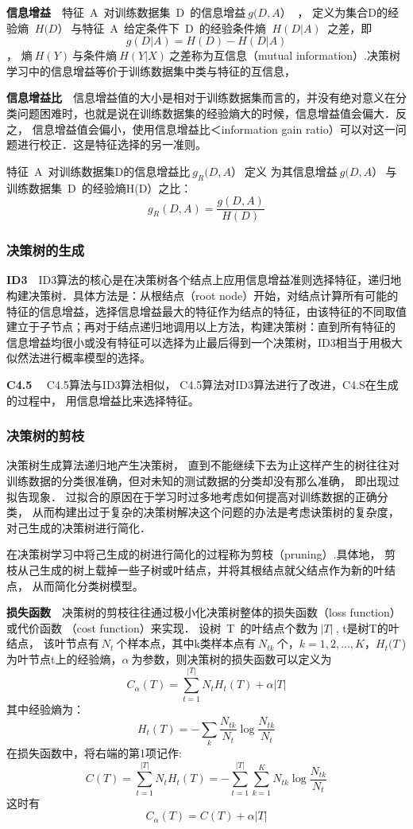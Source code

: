 \textbf{信息增益}~~特征~A~对训练数据集~D~的信息增益$~g(D,A）~$ ， 定义为集合D的经验熵 $~H(D）~$与特征~A~给定条件下~D~的经验条件熵 $~H(D|A)~$ 之差，即$$g(D|A) = H(D)-H(D|A)$$
， 熵$~H(Y)~$与条件熵$~H(Y|X)~$之差称为互信息（mutual information）.决策树学习中的信息增益等价于训练数据集中类与特征的互信息，

\textbf{信息增益比}~~信息增益值的大小是相对于训练数据集而言的，并没有绝对意义在分类问题困难时，也就是说在训练数据集的经验熵大的时候，信息增益值会偏大．反之， 信息增益值会偏小，使用信息增益比＜information gain ratio）可以对这一问题进行校正．这是特征选择的另一准则。

特征~A~对训练数据集D的信息增益比$~g_R(D,A）~$定义 为其信息增益$~g(D,A）~$与训练数据集~D~的经验熵H(D）之比：$$g_R(D,A)=\frac{g(D,A)}{H(D)}$$


\subsubsection{决策树的生成}
\textbf{ID3}~~ID3算法的核心是在决策树各个结点上应用信息增益准则选择特征，递归地构建决策树．具体方法是：从根结点（root node）开始，对结点计算所有可能的特征的信息增益，选择信息增益最大的特征作为结点的特征，由该特征的不同取值建立于子节点；再对于结点递归地调用以上方法，构建决策树：直到所有特征的 信息增益均很小或没有特征可以选择为止最后得到一个决策树，ID3相当于用极大似然法进行概率模型的选择。

\textbf{C4.5}~~ C4.5算法与ID3算法相似， C4.5算法对ID3算法进行了改进，C4.S在生成的过程中， 用信息增益比来选择特征。

\subsubsection{决策树的剪枝}
决策树生成算法递归地产生决策树， 直到不能继续下去为止这样产生的树往往对训练数据的分类很准确，但对未知的测试数据的分类却没有那么准确， 即出现过拟告现象． 过拟合的原因在于学习时过多地考虑如何提高对训练数据的正确分类， 从而构建出过于复杂的决策树解决这个问题的办法是考虑诀策树的复杂度， 对己生成的决策树进行简化．

在决策树学习中将己生成的树进行简化的过程称为剪枝（pruning）.具体地， 剪枝从己生成的树上载掉一些子树或叶结点，并将其根结点就父结点作为新的叶结点， 从而简化分类树模型。

\textbf{损失函数}~~决策树的剪枝往往通过极小化决策树整体的损失函数（loss function）或代价函数 （cost function）来实现． 设树~T~的叶结点个数为$~|T|~$, t是树T的叶结点， 该叶节点有$~N_t~$个样本点，其中k类样本点有$~N_{tk}~$个，$k=1,2,...,K$，$H_t(T~$)为叶节点t上的经验熵，$\alpha~$为参数，则决策树的损失函数可以定义为$$C_\alpha(T)=\sum_{t=1}^{|T|}N_tH_t(T)+\alpha|T|$$
其中经验熵为：
$$H_t(T) = -\sum_{k}\frac{N_{tk}}{N_t}\log\frac{N_{tk}}{N_t}$$
在损失函数中，将右端的第1项记作:
$$C(T) = \sum_{t=1}^{|T|}N_tH_t(T)=-\sum_{t=1}^{|T|}\sum_{k=1}^{K}N_{tk}\log \frac{N_{tk}}{N_t}$$
这时有$$C_\alpha(T)=C(T)+\alpha|T|$$


